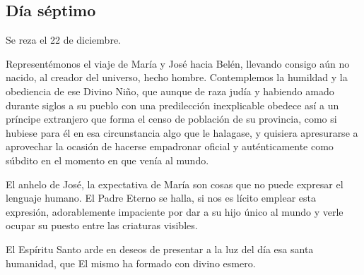 \documentclass[spanish,utf8,twocolumn]{chlart}
\newenvironment{summary}{\begingroup
	\small\sffamily\itshape%
	\setlength{\leftskip}{3em}\setlength{\rightskip}{3em}\noindent
	}{\par\endgroup}
\newenvironment{lectura}{\begingroup\color{lector}}{\endgroup\par}
\begin{document}
\subsection*{Día séptimo}
\begin{summary}
Se reza el 22 de diciembre.
\end{summary}
\begin{lectura}
Representémonos el viaje de María y José hacia Belén, llevando consigo
aún no nacido, al creador del universo, hecho hombre.
Contemplemos la humildad y la obediencia de ese Divino Niño, que aunque
de raza judía y habiendo amado durante siglos a su pueblo con una
predilección inexplicable obedece así a un príncipe extranjero que forma
el censo de población de su provincia, como si hubiese para él en esa
circunstancia algo que le halagase, y quisiera apresurarse a aprovechar
la ocasión de hacerse empadronar oficial y auténticamente como súbdito
en el momento en que venía al mundo.

El anhelo de José, la expectativa de María son cosas que no puede
expresar el lenguaje humano.
El Padre Eterno se halla, si nos es lícito emplear esta expresión,
adorablemente impaciente por dar a su hijo único al mundo y verle ocupar
su puesto entre las criaturas visibles.

El Espíritu Santo arde en deseos de presentar a la luz del día esa santa
humanidad, que El mismo ha formado con divino esmero.
\end{lectura}
\end{document}
